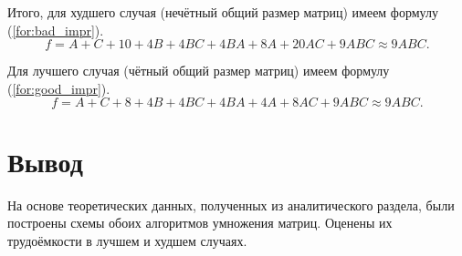 Итого, для худшего случая (нечётный общий размер матриц) имеем формулу (\ref{for:bad_impr}).
\begin{equation}
\label{for:bad_impr}
f = A + C + 10 + 4B + 4BC + 4BA + 8A + 20AC + 9ABC \approx 9ABC.
\end{equation}

Для лучшего случая (чётный общий размер матриц) имеем формулу (\ref{for:good_impr}).
\begin{equation}
\label{for:good_impr}
f = A + C + 8 + 4B +4BC + 4BA + 4A + 8AC + 9ABC \approx 9ABC.
\end{equation}

\section{Вывод}
На основе теоретических данных, полученных из аналитического раздела, были построены схемы обоих алгоритмов умножения матриц.  Оценены их трудоёмкости в лучшем и худшем случаях.
